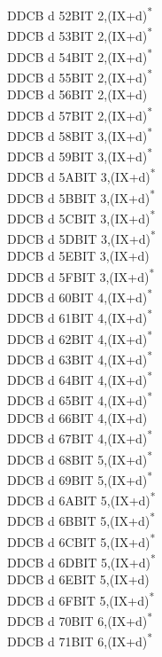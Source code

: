 \documentclass[oneside,a4paper]{book}
\begin{document}
\begin{multicols}{3}
{\begin{tabbing}
DDCB d 52\>BIT 2,(IX+d)\textsuperscript{*}\\
DDCB d 53\>BIT 2,(IX+d)\textsuperscript{*}\\
DDCB d 54\>BIT 2,(IX+d)\textsuperscript{*}\\
DDCB d 55\>BIT 2,(IX+d)\textsuperscript{*}\\
DDCB d 56\>BIT 2,(IX+d)\\
DDCB d 57\>BIT 2,(IX+d)\textsuperscript{*}\\
DDCB d 58\>BIT 3,(IX+d)\textsuperscript{*}\\
DDCB d 59\>BIT 3,(IX+d)\textsuperscript{*}\\
DDCB d 5A\>BIT 3,(IX+d)\textsuperscript{*}\\
DDCB d 5B\>BIT 3,(IX+d)\textsuperscript{*}\\
DDCB d 5C\>BIT 3,(IX+d)\textsuperscript{*}\\
DDCB d 5D\>BIT 3,(IX+d)\textsuperscript{*}\\
DDCB d 5E\>BIT 3,(IX+d)\\
DDCB d 5F\>BIT 3,(IX+d)\textsuperscript{*}\\
DDCB d 60\>BIT 4,(IX+d)\textsuperscript{*}\\
DDCB d 61\>BIT 4,(IX+d)\textsuperscript{*}\\
DDCB d 62\>BIT 4,(IX+d)\textsuperscript{*}\\
DDCB d 63\>BIT 4,(IX+d)\textsuperscript{*}\\
DDCB d 64\>BIT 4,(IX+d)\textsuperscript{*}\\
DDCB d 65\>BIT 4,(IX+d)\textsuperscript{*}\\
DDCB d 66\>BIT 4,(IX+d)\\
DDCB d 67\>BIT 4,(IX+d)\textsuperscript{*}\\
DDCB d 68\>BIT 5,(IX+d)\textsuperscript{*}\\
DDCB d 69\>BIT 5,(IX+d)\textsuperscript{*}\\
DDCB d 6A\>BIT 5,(IX+d)\textsuperscript{*}\\
DDCB d 6B\>BIT 5,(IX+d)\textsuperscript{*}\\
DDCB d 6C\>BIT 5,(IX+d)\textsuperscript{*}\\
DDCB d 6D\>BIT 5,(IX+d)\textsuperscript{*}\\
DDCB d 6E\>BIT 5,(IX+d)\\
DDCB d 6F\>BIT 5,(IX+d)\textsuperscript{*}\\
DDCB d 70\>BIT 6,(IX+d)\textsuperscript{*}\\
DDCB d 71\>BIT 6,(IX+d)\textsuperscript{*}\\

\end{tabbing}}
\end{multicols}
\end{document}
